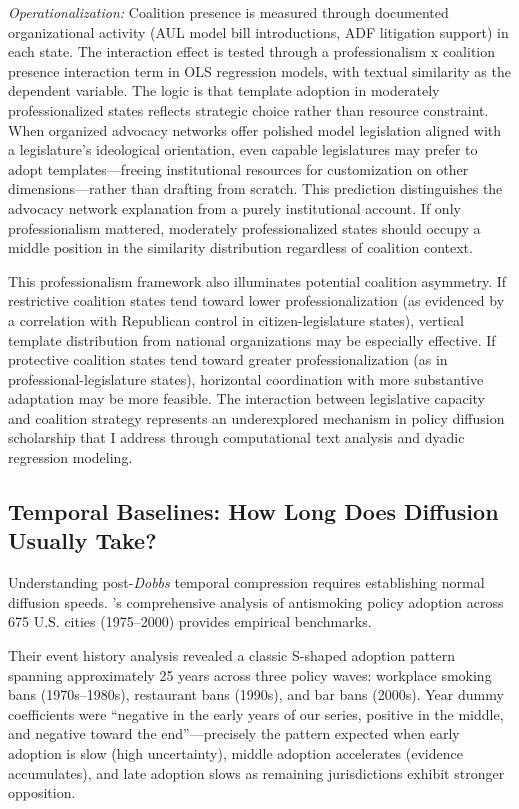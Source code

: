 \emph{Operationalization:} Coalition presence is measured through documented organizational activity (AUL model bill introductions, ADF litigation support) in each state. The interaction effect is tested through a professionalism x coalition presence interaction term in OLS regression models, with textual similarity as the dependent variable.
The logic is that template adoption in moderately professionalized states reflects strategic choice rather than resource constraint. When organized advocacy networks offer polished model legislation aligned with a legislature's ideological orientation, even capable legislatures may prefer to adopt templates---freeing institutional resources for customization on other dimensions---rather than drafting from scratch. This prediction distinguishes the advocacy network explanation from a purely institutional account. If only professionalism mattered, moderately professionalized states should occupy a middle position in the similarity distribution regardless of coalition context.

This professionalism framework also illuminates potential coalition asymmetry. If restrictive coalition states tend toward lower professionalization (as evidenced by a correlation with Republican control in citizen-legislature states), vertical template distribution from national organizations may be especially effective. If protective coalition states tend toward greater professionalization (as in professional-legislature states), horizontal coordination with more substantive adaptation may be more feasible. The interaction between legislative capacity and coalition strategy represents an underexplored mechanism in policy diffusion scholarship that I address through computational text analysis and dyadic regression modeling.

\subsection{Temporal Baselines: How Long Does Diffusion Usually Take?}

Understanding post-\emph{Dobbs} temporal compression requires establishing normal diffusion speeds. \textcite{shipanMechanismsPolicyDiffusion2008a}'s comprehensive analysis of antismoking policy adoption across 675 U.S. cities (1975--2000) provides empirical benchmarks.

Their event history analysis revealed a classic S-shaped adoption pattern spanning approximately 25 years across three policy waves: workplace smoking bans (1970s--1980s), restaurant bans (1990s), and bar bans (2000s). Year dummy coefficients were ``negative in the early years of our series, positive in the middle, and negative toward the end''---precisely the pattern expected when early adoption is slow (high uncertainty), middle adoption accelerates (evidence accumulates), and late adoption slows as remaining jurisdictions exhibit stronger opposition.

